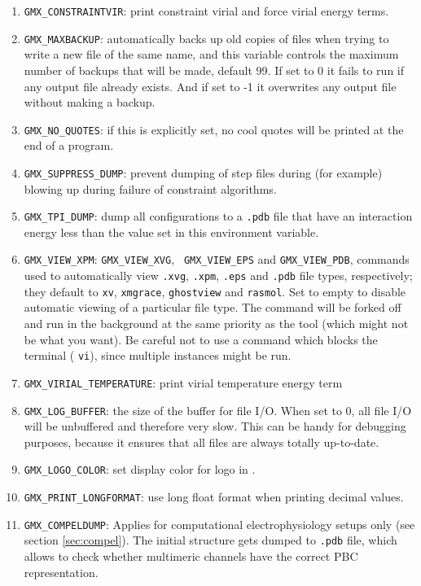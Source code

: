 \begin{enumerate}

\item   {\tt GMX_CONSTRAINTVIR}: print constraint virial and force virial energy terms.
\item   {\tt GMX_MAXBACKUP}: {\gromacs} automatically backs up old
        copies of files when trying to write a new file of the same
        name, and this variable controls the maximum number of
        backups that will be made, default 99. If set to 0 it fails to
        run if any output file already exists. And if set to -1 it
        overwrites any output file without making a backup.
\item   {\tt GMX_NO_QUOTES}: if this is explicitly set, no cool quotes
        will be printed at the end of a program.
\item   {\tt GMX_SUPPRESS_DUMP}: prevent dumping of step files during
        (for example) blowing up during failure of constraint
        algorithms.
\item   {\tt GMX_TPI_DUMP}: dump all configurations to a {\tt .pdb}
        file that have an interaction energy less than the value set
        in this environment variable.
\item   {\tt GMX_VIEW_XPM}: {\tt GMX_VIEW_XVG}, {\tt
        GMX_VIEW_EPS} and {\tt GMX_VIEW_PDB}, commands used to
        automatically view \@ {\tt .xvg}, {\tt .xpm}, {\tt .eps}
        and {\tt .pdb} file types, respectively; they default to {\tt xv}, {\tt xmgrace},
        {\tt ghostview} and {\tt rasmol}. Set to empty to disable
        automatic viewing of a particular file type. The command will
        be forked off and run in the background at the same priority
        as the {\gromacs} tool (which might not be what you want).
        Be careful not to use a command which blocks the terminal
        ({\eg} {\tt vi}), since multiple instances might be run.
\item   {\tt GMX_VIRIAL_TEMPERATURE}: print virial temperature energy term
\item   {\tt GMX_LOG_BUFFER}: the size of the buffer for file I/O. When set
        to 0, all file I/O will be unbuffered and therefore very slow.
        This can be handy for debugging purposes, because it ensures
        that all files are always totally up-to-date.
\item   {\tt GMX_LOGO_COLOR}: set display color for logo in {\tt {}}.
\item   {\tt GMX_PRINT_LONGFORMAT}: use long float format when printing
        decimal values.
\item   {\tt GMX_COMPELDUMP}: Applies for computational electrophysiology setups
        only (see section \ref{sec:compel}). The initial structure gets dumped to 
        {\tt .pdb} file, which allows to check whether multimeric channels have 
        the correct PBC representation. 
\end{enumerate}


